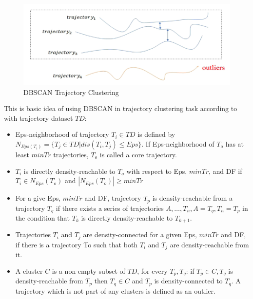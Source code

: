 \documentclass[a4paper, 12pt]{article}
\begin{document}
\begin{figure}[ht]
    \centering
    \includegraphics[width=1\textwidth]{DBSCAN Trajectory Clustering.png}
    \caption{DBSCAN Trajectory Clustering \citep{su2020survey}}
\end{figure}

This is basic idea of using DBSCAN in trajectory clustering task according to \cite{moayedi2019evaluation} with trajectory dataset $TD$:

\begin{itemize}
    \item Eps-neighborhood of trajectory $T_{i} \in TD$ is defined by $N_{Eps(T_{i})} = \{T_{j} \in TD|dis(T_{i}, T_{j}) \leq Eps\}$. If Eps-neighborhood of $T_{o}$ has at least $minTr$ trajectories, $T_{o}$ is called a core trajectory.
    \item $T_{i}$ is directly density-reachable to $T_{o}$ with respect to Eps, $minTr$, and DF if $T_{i} \in N_{Eps}(T_{o})$ and $|N_{Eps}(T_{o})| \geq minTr$ 
    \item For a give Eps, $minTr$ and DF, trajectory $T_{p}$ is density-reachable from a trajectory $T_{q}$ if there exists a series of trajectories $A,\dots,T_{n}, A=T_{q}, T_{n}=T_{p}$ in the condition that $T_{k}$ is directly density-reachable to $T_{k+1}$.
    \item Trajectories $T_{i}$ and $T_{j}$ are density-connected for a given Eps, $minTr$ and DF, if there is a trajectory To such that both $T_{i}$ and $T_{j}$ are density-reachable from it.
    \item A cluster $C$ is a non-empty subset of $TD$, for every $T_{p}, T_{q}$: if $T_{p} \in C, T_{q}$ is density-reachable from $T_{p}$ then $T_{q} \in C$ and $T_{p}$ is density-connected to $T_{q}$. A trajectory which is not part of any clusters is defined as an outlier.
\end{itemize}
\end{document}
